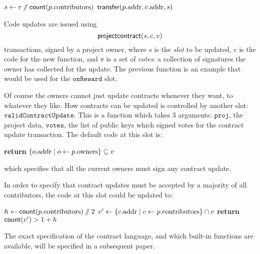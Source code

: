 \begin{algorithmic}[1]
\State $s \gets r \sslash \mathsf{count}(p.{\mathrm{contributors}})$
  \State $\mathsf{transfer}\small{\lparen p.{\mathrm{addr}}, c.{\mathrm{addr}}, s\rparen}$
\EndFor
\EndProcedure
\end{algorithmic}

Code updates are issued using
\[
    \mathsf{projectcontract}\small{\lparen s, c, v\rparen}
\]
transactions, signed by a project owner, where $s$ is the \emph{slot} to be
updated, $c$ is the code for the new function, and $\mathtt{v}$ is a set of
\emph{votes}: a collection of signatures the owner has collected for the
update. The previous function is an example that would be used for the
$\mathtt{onReward}$ slot.

Of course the owners cannot just update contracts whenever they want, to
whatever they like. How contracts can be updated is controlled by another slot:
$\mathtt{validContractUpdate}$. This is a function which takes 3 arguments:
$\mathtt{proj}$, the project data, $\mathtt{votes}$, the list of public keys
which signed votes for the contract update transaction. The default code at this
slot is:

\begin{algorithmic}[1]
\State \textbf{return} $\{ o.{\mathrm{addr}} \mid o \gets p.{\mathrm{owners}} \} \subseteq v$
\EndProcedure
\end{algorithmic}
which specifies that all the current owners must sign any contract update.

In order to specify that contract updates must be accepted by a majority of all
contributors, the code at this slot could be updated to:

\begin{algorithmic}[1]
\State $h \gets \mathsf{count}(p.{\mathrm{contributors}}) \sslash 2$
\State $v' \gets \{ c.{\mathrm{addr}} \mid c \gets p.{\mathrm{contributors}} \} \cap v$
\State \textbf{return} $\mathsf{count}(v') > 1 + h$
\EndProcedure
\end{algorithmic}

The exact specification of the contract language, and which built-in functions
are available, will be specified in a subsequent paper.
